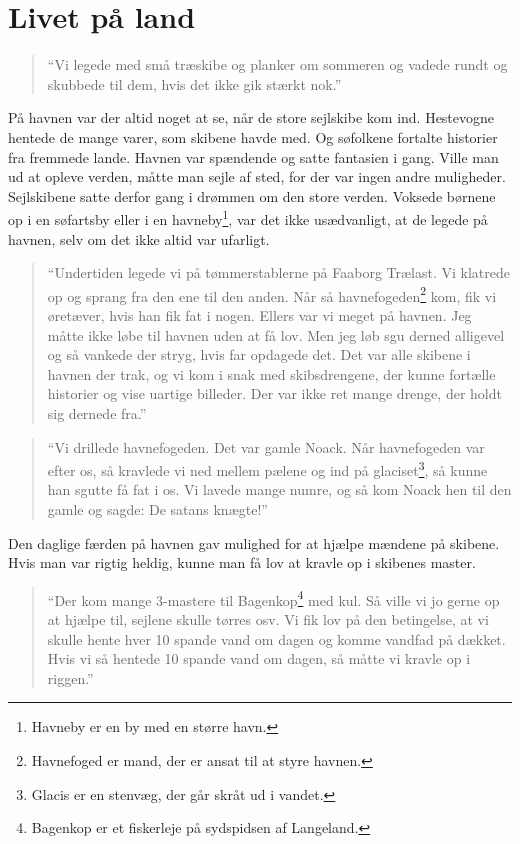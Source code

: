 \chapter{Livet på land}\label{livet-puxe5-land}

\begin{quote}
``Vi legede med små træskibe og planker om sommeren og vadede rundt og
skubbede til dem, hvis det ikke gik stærkt nok.''
\end{quote}

På havnen var der altid noget at se, når de store sejlskibe kom ind.
Hestevogne hentede de mange varer, som skibene havde med. Og søfolkene
fortalte historier fra fremmede lande. Havnen var spændende og satte
fantasien i gang. Ville man ud at opleve verden, måtte man sejle af
sted, for der var ingen andre muligheder. Sejlskibene satte derfor gang
i drømmen om den store verden. Voksede børnene op i en søfartsby eller i
en havneby\footnote{Havneby er en by med en større havn.}, var det ikke
usædvanligt, at de legede på havnen, selv om det ikke altid var
ufarligt.

\begin{quote}
``Undertiden legede vi på tømmerstablerne på Faaborg Trælast. Vi
klatrede op og sprang fra den ene til den anden. Når så
havnefogeden\footnote{Havnefoged er mand, der er ansat til at styre
  havnen.} kom, fik vi øretæver, hvis han fik fat i nogen. Ellers var vi
meget på havnen. Jeg måtte ikke løbe til havnen uden at få lov. Men jeg
løb sgu derned alligevel og så vankede der stryg, hvis far opdagede det.
Det var alle skibene i havnen der trak, og vi kom i snak med
skibsdrengene, der kunne fortælle historier og vise uartige billeder.
Der var ikke ret mange drenge, der holdt sig dernede fra.''
\end{quote}

\begin{quote}
``Vi drillede havnefogeden. Det var gamle Noack. Når havnefogeden var
efter os, så kravlede vi ned mellem pælene og ind på glaciset\footnote{Glacis
  er en stenvæg, der går skråt ud i vandet.}, så kunne han sgutte få fat
i os. Vi lavede mange numre, og så kom Noack hen til den gamle og sagde:
De satans knægte!''
\end{quote}

Den daglige færden på havnen gav mulighed for at hjælpe mændene på
skibene. Hvis man var rigtig heldig, kunne man få lov at kravle op i
skibenes master.

\begin{quote}
``Der kom mange 3-mastere til Bagenkop\footnote{Bagenkop er et
  fiskerleje på sydspidsen af Langeland.} med kul. Så ville vi jo gerne
op at hjælpe til, sejlene skulle tørres osv. Vi fik lov på den
betingelse, at vi skulle hente hver 10 spande vand om dagen og komme
vandfad på dækket. Hvis vi så hentede 10 spande vand om dagen, så måtte
vi kravle op i riggen.''
\end{quote}

